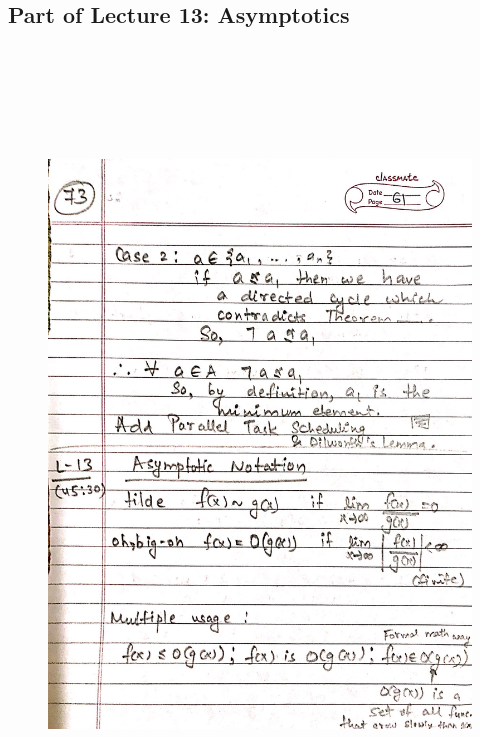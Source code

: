 \newpage
{\color{black} \subsection*{Part of Lecture 13: Asymptotics}}
\begin{figure}[H]
    \centering
    \includegraphics[width=16cm, height=21cm]{"./MIT-6.042J/MIT-6042J-073"}
\end{figure}

